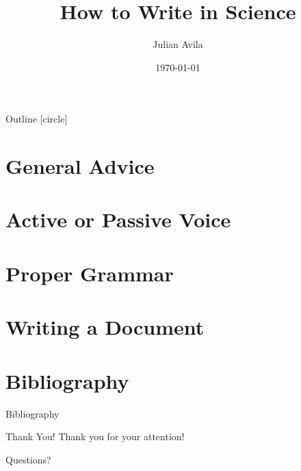\documentclass[aspectratio=169,sn-mathphys-num]{beamer}
\title{How to Write in Science}
\author{Julian Avila}
\institute{Universidad Distrital Francisco José de Caldas}
\date{\today}
\begin{document}
\begin{frame}
	\titlepage
\end{frame}

\begin{frame}{Outline}
	[circle]
	\tableofcontents
\end{frame}

\section{General Advice}


\section{Active or Passive Voice}


\section{Proper Grammar}


\section{Writing a Document}


\section{Bibliography}
\begin{frame}[allowframebreaks]{Bibliography}
	\printbibliography
\end{frame}

\begin{frame}{Thank You!}
	\centering
	{\LARGE Thank you for your attention!}
	\vspace{0.5cm}

	\Large Questions?
\end{frame}
\end{document}
